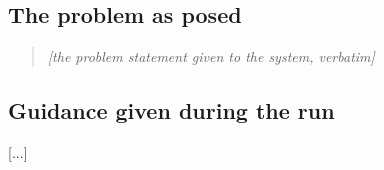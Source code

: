 \documentclass[11pt]{article}
\numberwithin{equation}{section}
\theoremstyle{plain}
\theoremstyle{definition}
\theoremstyle{remark}
\begin{document}
\subsection{The problem as posed}\label{app:ai-problem}
\begin{quote}\itshape
[the problem statement given to the system, verbatim]
\end{quote}

\subsection{Guidance given during the run}\label{app:ai-guidance}
[...]
\end{document}
